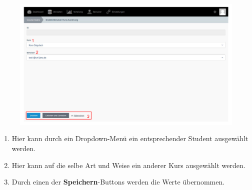   \begin{figure}
  	\centering
  	\includegraphics[scale=0.5]{backend/img/distribution_5.pdf}
  \end{figure}
  \begin{enumerate}
   \item Hier kann durch ein Dropdown-Menü ein entsprechender Student ausgewählt werden.
   \item Hier kann auf die selbe Art und Weise ein anderer Kurs ausgewählt werden.
   \item Durch einen der \textbf{Speichern}-Buttons werden die Werte übernommen.
  \end{enumerate}

